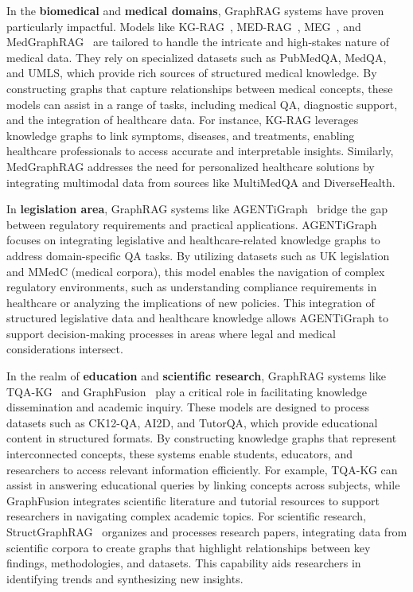 \documentclass[lettersize,journal]{IEEEtran}
\begin{document}
In the \textbf{biomedical} and \textbf{medical domains}, GraphRAG systems have proven particularly impactful. Models like KG-RAG~\cite{soman2023biomedical}, MED-RAG~\cite{zhao2025medrag}, MEG~\cite{cabello2024meg}, and MedGraphRAG~\cite{wu2024medical} are tailored to handle the intricate and high-stakes nature of medical data. They rely on specialized datasets such as PubMedQA, MedQA, and UMLS, which provide rich sources of structured medical knowledge. By constructing graphs that capture relationships between medical concepts, these models can assist in a range of tasks, including medical QA, diagnostic support, and the integration of healthcare data. For instance, KG-RAG leverages knowledge graphs to link symptoms, diseases, and treatments, enabling healthcare professionals to access accurate and interpretable insights. Similarly, MedGraphRAG addresses the need for personalized healthcare solutions by integrating multimodal data from sources like MultiMedQA and DiverseHealth.

In \textbf{legislation area}, GraphRAG systems like AGENTiGraph~\cite{zhao2024agentigraph} bridge the gap between regulatory requirements and practical applications. AGENTiGraph focuses on integrating legislative and healthcare-related knowledge graphs to address domain-specific QA tasks. By utilizing datasets such as UK legislation and MMedC (medical corpora), this model enables the navigation of complex regulatory environments, such as understanding compliance requirements in healthcare or analyzing the implications of new policies. This integration of structured legislative data and healthcare knowledge allows AGENTiGraph to support decision-making processes in areas where legal and medical considerations intersect.

In the realm of \textbf{education} and \textbf{scientific research}, GraphRAG systems like TQA-KG~\cite{he2024enhancing} and GraphFusion~\cite{yang2024graphusion} play a critical role in facilitating knowledge dissemination and academic inquiry. These models are designed to process datasets such as CK12-QA, AI2D, and TutorQA, which provide educational content in structured formats. By constructing knowledge graphs that represent interconnected concepts, these systems enable students, educators, and researchers to access relevant information efficiently. For example, TQA-KG can assist in answering educational queries by linking concepts across subjects, while GraphFusion integrates scientific literature and tutorial resources to support researchers in navigating complex academic topics. For scientific research, StructGraphRAG~\cite{zhu2024structugraphrag} organizes and processes research papers, integrating data from scientific corpora to create graphs that highlight relationships between key findings, methodologies, and datasets. This capability aids researchers in identifying trends and synthesizing new insights.
\end{document}
